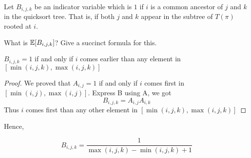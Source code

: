 \documentclass[11pt,a4paper,oneside]{article}
\newcommand{\E}{\mathop{\mathbb{E\/}}}
\begin{document}
\begin{problem}{6}
\statement
Let $B_{i,j,k}$ be an indicator variable which is $1$ if $i$ is a common ancestor
of $j$ and $k$ in the quicksort tree. That is, if both $j$ and $k$ appear in the 
subtree of $T(\pi)$ rooted at $i$.

What is $\E[B_{i,j,k}]$? Give a succinct formula for this.

\solution
\begin{lemma}
	$B_{i, j, k} = 1$ if and only if $i$ comes earlier than any element in $[\min(i, j, k), \max(i, j, k)]$

	\begin{proof}
		We proved that \(A_{i, j} = 1\) if and only if \(i\) comes first in \([\min(i, j), \max(i, j)]\). Express B using A, we got 
		$$B_{i, j, k} = A_{i, j}A_{i, k}$$ 
		Thus \(i\) comes first than any other element in $[\min(i, j, k), \max(i, j, k)]$
	\end{proof}
	
\end{lemma}

Hence,

\[ B_{i, j, k} = \frac{1}{\max(i, j, k) - \min(i, j, k) + 1} \]
\end{problem}
\end{document}

